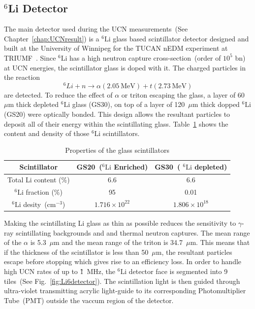 \subsection{$^6$Li Detector\label{sec:Li6detector}}
The main detector used during the UCN measurements~(See
Chapter~\ref{chap:UCNresult}) is a $^6\mathrm{Li}$ glass based scintillator
detector designed and built at the University of Winnipeg for the
TUCAN nEDM experiment at
TRIUMF~\cite{jamieson2017characterization}. Since $^6\mathrm{Li}$ has a high
neutron capture cross-section~(order of $10^5$ bn) at UCN energies,
the scintillator glass is doped with it. The charged particles in the
reaction
\begin{equation}
^6Li + n \rightarrow \alpha (2.05~\mathrm{MeV}) + t (2.73~\mathrm{MeV})
\end{equation}
are detected. To reduce the effect of $\alpha$ or triton escaping the
glass, a layer of 60~$\mu$m thick depleted $^6\mathrm{Li}$ glass (GS30), on top
of a layer of 120~$\mu$m thick dopped $^6\mathrm{Li}$ (GS20) were optically
bonded. This design allows the resultant particles to deposit all of
their energy within the scintillating
glass. Table~\ref{tab:scintillator} shows the content and density of
those $^6\mathrm{Li}$ scintillators.

\begin{table}[h!]
  \centering
  \label{tab:scintillator}
  \begin{tabular}{|c|c|c|}
    \hline
    Scintillator & GS20~($^6\mathrm{Li}$ Enriched) & GS30~( $^6\mathrm{Li}$ depleted) \\
    \hline
    Total Li content (\%) & 6.6 & 6.6 \\
    \hline
    $^6\mathrm{Li}$ fraction (\%) & 95 & 0.01 \\
    \hline
    $^6\mathrm{Li}$ desity~(cm$^{-3}$) & $1.716 \times 10^{22}$ & $1.806 \times 10^{18}$ \\
    \hline
  \end{tabular}
  \caption{Properties of the glass scintillators}
\end{table}


Making the scintillating Li glass as thin as possible reduces the
sensitivity to $\gamma$-ray scintillating backgrounds and and thermal
neutron captures. The mean range of the $\alpha$ is 5.3~$\mu$m and the
mean range of the triton is 34.7~$\mu$m. This means that if the
thickness of the scintillator is less than 50~$\mu$m, the resultant
particles escape before stopping which gives rise to an efficiency
loss.  In order to handle high UCN rates of up to \~1~MHz, the
$^6\mathrm{Li}$ detector face is segmented into 9 tiles~(See
Fig.~\ref{fig:Li6detector}). The scintillation light is then guided
through ultra-violet transmitting acrylic light-guide to its
corresponding Photomultiplier Tube~(PMT) outside the vaccum region of
the detector.

